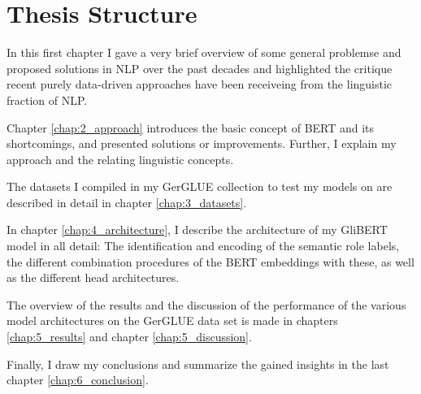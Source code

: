 \section{Thesis Structure}

In this first chapter I gave a very brief overview of some general problemse and proposed solutions in
NLP over the past decades and highlighted the critique recent purely data-driven approaches have been
receiveing from the linguistic fraction of NLP.

Chapter \ref{chap:2_approach} introduces the basic concept of BERT and its shortcomings,
and presented solutions or improvements. Further, I explain my approach and the relating
linguistic concepts.

The datasets I compiled in my GerGLUE collection to test my models on are described in detail in
chapter \ref{chap:3_datasets}.

In chapter \ref{chap:4_architecture}, I describe the architecture of my GliBERT model in all
detail: The identification and encoding of the semantic role labels, the different combination
procedures of the BERT embeddings with these, as well as the different head architectures.

The overview of the results and the discussion of the performance of the various model architectures on
the GerGLUE data set is made in chapters \ref{chap:5_results} and chapter \ref{chap:5_discussion}.

Finally, I draw my conclusions and summarize the gained insights in the last chapter \ref{chap:6_conclusion}.

